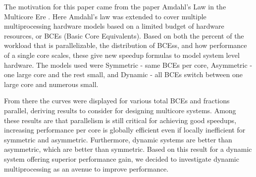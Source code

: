 The motivation for this paper came from the paper Amdahl's Law in the Multicore Ere \cite{hill}. Here Amdahl's law was extended to cover multiple multiprocessing hardware models based on a limited budget of hardware resources, or BCEs (Basic Core Equivalents). Based on both the percent of the workload that is parallelizable, the distribution of BCEss, and how performance of a single core scales, these give new speedup formulas to model system level hardware. The models used were Symmetric - same BCEs per core, Asymmetric - one large core and the rest small, and Dynamic - all BCEs switch between one large core and numerous small. 

From there the curves were displayed for various total BCEs and fractions parallel, deriving results to consider for designing multicore systems. Among these results are that parallelism is still critical for achieving good speedups, increasing performance per core is globally efficient even if locally inefficient for symmetric and asymmetric. Furthermore, dynamic systems are better than asymmetric, which are better than symmetric. Based on this result for a dynamic system offering superior performance gain, we decided to investigate dynamic multiprocessing as an avenue to improve performance.
